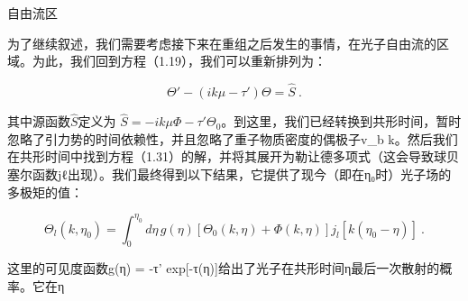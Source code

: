 自由流区

为了继续叙述，我们需要考虑接下来在重组之后发生的事情，在光子自由流的区域。为此，我们回到方程（1.19），我们可以重新排列为：

\[ \Theta' - (ik\mu - \tau') \Theta = \hat{S}~. \]

其中源函数\( \hat{S} \)定义为 \( \hat{S} = -ik\mu \Phi - \tau' \Theta_0 \)。到这里，我们已经转换到共形时间，暂时忽略了引力势的时间依赖性，并且忽略了重子物质密度的偶极子v_b k。然后我们在共形时间中找到方程（1.31）的解，并将其展开为勒让德多项式（这会导致球贝塞尔函数jℓ出现）。我们最终得到以下结果，它提供了现今（即在η₀时）光子场的多极矩的值：

\[ \Theta_l(k, \eta_0) = \int_0^{\eta_0} d\eta \, g(\eta) \left[ \Theta_0(k, \eta) + \Phi(k, \eta) \right] j_l[k(\eta_0 - \eta)]~.\]

这里的可见度函数g(η) = -τ' exp[-τ(η)]给出了光子在共形时间η最后一次散射的概率。它在η 

